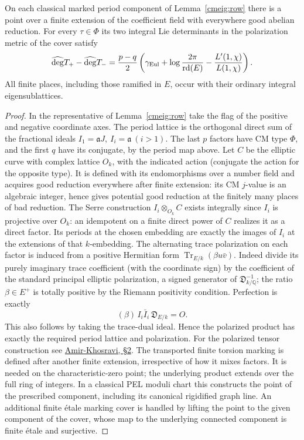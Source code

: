 \begin{proposition}\label{cmeig:degree}
On each classical marked period component of
Lemma~\ref{cmeig:row} there is a point over a finite extension of
the coefficient field with everywhere good abelian reduction. For
every \(\tau\in\Phi\) its two integral Lie determinants in the
polarization metric of the cover satisfy
\[
 \widehat{\deg}T_+-\widehat{\deg}T_-=
   \frac{p-q}{2}\left(\gamma_{\rm Eul}+
     \log\frac{2\pi}{{\rm rd}(E)}
       -\frac{L'(1,\chi)}{L(1,\chi)}\right).
\]
All finite places, including those ramified in \(E\), occur with
their ordinary integral eigensublattices.
\end{proposition}
\begin{proof}
In the representative of Lemma~\ref{cmeig:row} take the flag of
the positive and negative coordinate axes. The period lattice
is the orthogonal direct sum of the fractional ideals
\(I_1=\mathfrak a J,\ I_i=\mathfrak a\ (i>1)\).
The last \(p\) factors have CM type \(\Phi\), and the first \(q\)
have its conjugate, by the period map above.
Let \(C\) be the elliptic curve with complex lattice \(O_k\),
with the indicated action (conjugate the action for the opposite
type). It is defined with its endomorphisms over a number field
and acquires good reduction everywhere after finite extension:
its CM \(j\)-value is an algebraic integer, hence gives potential
good reduction at the finitely many places of bad reduction.
The Serre construction \(I_i\otimes_{O_k} C\) exists integrally
since \(I_i\) is projective over \(O_k\): an idempotent on a
finite direct power of \(C\) realizes it as a direct factor.
Its periods at the chosen embedding are exactly the images of
\(I_i\) at the extensions of that \(k\)-embedding. The alternating
trace polarization on each factor is induced from a positive
Hermitian form \(\operatorname{Tr}_{E/k}(\beta u\bar v)\).
Indeed divide its purely imaginary trace coefficient (with the
coordinate sign) by the coefficient of the standard principal
elliptic polarization, a signed generator of
\(\mathfrak D_{k/\mathbb Q}^{-1}\); the ratio \(\beta\in E^+\)
is totally positive by the Riemann positivity condition.
Perfection is exactly
\[
       (\beta)\,I_i\bar I_i\,\mathfrak D_{E/k}=O .
\]
This also follows by taking the trace-dual ideal. Hence the
polarized product has exactly the required period lattice and
polarization. For the polarized tensor construction see
\href{https://arxiv.org/abs/1507.07607}{Amir-Khosravi, \S2}.
The transported finite torsion marking is defined after another
finite extension, irrespective of how it mixes factors. It is
needed on the characteristic-zero point; the underlying product
extends over the full ring of integers. In a classical PEL moduli
chart this constructs the point of the prescribed component,
including its canonical rigidified graph line. An additional
finite étale marking cover is handled by lifting the point to
the given component of the cover, whose map to the underlying
connected component is finite étale and surjective.


\end{proof}
